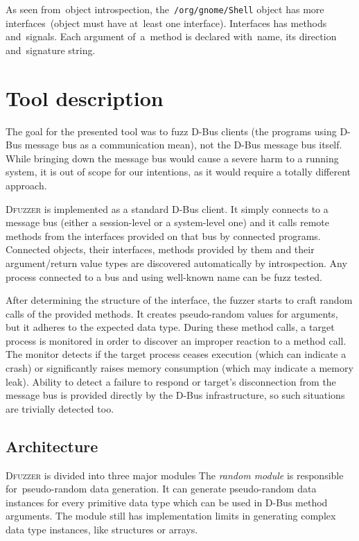 \documentclass[conference]{IEEEtran}
\begin{document}
\noindent
As seen from~object introspection, the~\texttt{/org/gnome/Shell} object has
more interfaces~(object must have at~least one interface). Interfaces has methods
and~signals. Each argument of~a~method is declared with~name, its direction
and~signature string.


\section{Tool description}
\label{sec:C}
The goal for the presented tool was to fuzz D-Bus clients (the programs using
D-Bus message bus as a communication mean), not the D-Bus message bus itself.
While bringing down the message bus would cause a severe harm to a running
system, it is out of scope for our intentions, as it would require a totally different approach.

\textsc{Dfuzzer} is implemented as a standard D-Bus client. It simply connects
to a message bus (either a session-level or a system-level one) and it calls
remote methods from the interfaces provided on that bus by connected programs.
Connected objects, their interfaces, methods provided by them and their
argument/return value types are discovered automatically by introspection. Any
process connected to a bus and using well-known name can be fuzz tested.

After determining the structure of the interface, the fuzzer starts to craft
random calls of the provided methods. It creates pseudo-random values for
arguments, but it adheres to the expected data type. During these method calls, a target process
is monitored in order to discover an improper reaction to a method call. The
monitor detects if the target process ceases execution (which can indicate a
crash) or significantly raises memory consumption (which may indicate a memory
leak). Ability to detect a failure to respond or target's disconnection from the
message bus is provided directly by the D-Bus infrastructure, so such situations
are trivially detected too.


\subsection{Architecture}
\textsc{Dfuzzer} is divided into three major modules The \emph{random module} is
responsible for~pseudo-random data generation. It can generate pseudo-random
data instances for every primitive data type which can be used in D-Bus method
arguments. The module still has implementation limits in generating complex data
type instances, like structures or arrays.
\end{document}
